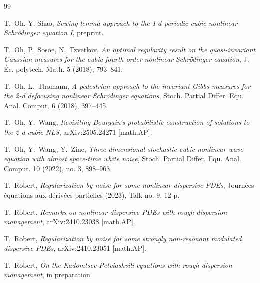 \documentclass[letterpaper, 11pt,  reqno]{amsart}
\newcommand{\1}{\hspace{0.5mm}\textup{I}\hspace{0.5mm}}
\numberwithin{equation}{section}
\numberwithin{theorem}{section}
\begin{document}
\begin{thebibliography}{99}






T.~Oh, Y. Shao,
{\it  Sewing lemma approach to the 1-$d$ periodic cubic nonlinear Schr\"odinger equation I},
preprint.

T.~Oh, P.~Sosoe, N.~Tzvetkov,
{\it  An optimal regularity result on the quasi-invariant Gaussian measures for the cubic fourth order nonlinear Schr\"odinger equation},  
J. \'Ec. polytech. Math. 5 (2018), 793--841. 



T.~Oh, L.~Thomann,
{\it  A pedestrian approach to the invariant Gibbs measures for the 2-d defocusing nonlinear Schr\"odinger equations},  Stoch. Partial Differ. Equ. Anal. Comput. 6 (2018), 397--445. 





T.~Oh, Y.~Wang,
{\it Revisiting Bourgain's probabilistic construction of solutions to the 2-d cubic NLS}, 
arXiv:2505.24271 [math.AP].


T.~Oh, Y.~Wang, Y.~Zine,
\textit{Three-dimensional stochastic cubic nonlinear wave equation with almost space-time white noise},
Stoch. Partial Differ. Equ. Anal. Comput. 10 (2022), no. 3, 898--963.


%
%
%



T.~Robert, 
{\it Regularization by noise for some nonlinear dispersive PDEs},
 Journ\'ees \'equations aux d\'eriv\'ees partielles (2023), Talk no. 9, 12 p. 





T.~Robert, 
{\it Remarks on nonlinear dispersive PDEs with rough dispersion management}, 
arXiv:2410.23038 [math.AP].




T.~Robert, 
{\it Regularization by noise for some strongly non-resonant modulated dispersive PDEs}, 
arXiv:2410.23051 [math.AP].


T.~Robert, 
{\it  On the Kadomtsev-Petviashvili equations with rough dispersion management}, 
 in preparation.




\end{thebibliography}
\end{document}

